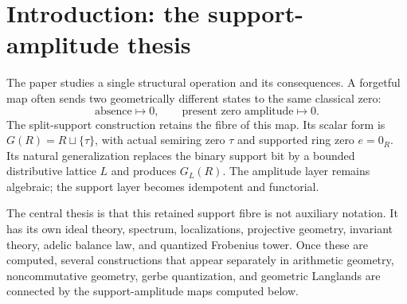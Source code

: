 \documentclass[11pt]{amsart}
\numberwithin{equation}{section}
\theoremstyle{definition}
\newcommand{\GL}{\operatorname{GL}}
\begin{document}
\begin{abstract}
Finite denominator phases admit nondegenerate quadratic refinements,
FHLT gerbe quantization, finite Heisenberg algebras, and theta modules.  The
matrix tower has universal UHF limit $\mathcal Q_\Omega$ with
\[
K_0(\mathcal Q_\Omega)\cong(\mathbf Q,\mathbf Q_{\ge0},1),\qquad
\mathcal D_\Omega\cong C(\widehat{\mathbf Z})\cong C^*(\mathbf Q/\mathbf Z).
\]
The identity $\GL_n(G_L(K))\cong N_{\GL_n}(T)(K)$ supplies a monomial
spectral chart: local systems are rank-one local systems on finite covers,
and every loop determinant factors over the cycles of the covering
monodromy.  On the Connes--Consani scaling-site covers these are Frobenius
cycles.  Split characteristic coefficients define a support-refined
Hitchin map, and pullback along the normalizer chart gives a monomial
restriction of the coarse geometric Langlands functor.  Finally, the
reciprocal-root skeleton of the perfect stalk has Beurling realization and
satisfies $x_{\Lambda_Q}\le d_Q^2$; density at the target section is the
Nyman--B\'aez-Duarte criterion and is equivalent to the Riemann hypothesis.
\end{abstract}

\maketitle
\tableofcontents

\section{Introduction: the support-amplitude thesis}
\label{sec:introduction}

The paper studies a single structural operation and its consequences.  A
forgetful map often sends two geometrically different states to the same
classical zero:
\[
\text{absence}\longmapsto0,
\qquad
\text{present zero amplitude}\longmapsto0.
\]
The split-support construction retains the fibre of this map.  Its scalar
form is $G(R)=R\sqcup\{\tau\}$, with actual semiring zero $\tau$ and
supported ring zero $e=0_R$.  Its natural generalization replaces the
binary support bit by a bounded distributive lattice $L$ and produces
$G_L(R)$.  The amplitude layer remains algebraic; the support layer becomes
idempotent and functorial.

The central thesis is that this retained support fibre is not auxiliary
notation.  It has its own ideal theory, spectrum, localizations,
projective geometry, invariant theory, adelic balance law, and quantized
Frobenius tower.  Once these are computed, several constructions that
appear separately in arithmetic geometry, noncommutative geometry,
gerbe quantization, and geometric Langlands are connected by the support-amplitude maps computed below.
\end{document}
